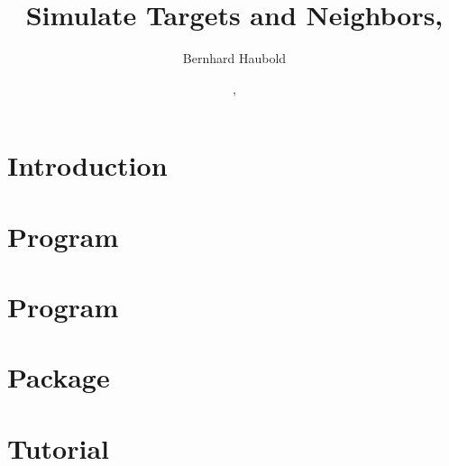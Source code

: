 \documentclass[a4paper]{report}
\begin{document}
\pagestyle{noweb}

\title{Simulate Targets and Neighbors, }
\author{Bernhard Haubold}
\date{\hspace{-3pt}, }
\maketitle
\tableofcontents
\chapter{Introduction}

\chapter{Program }

\chapter{Program }

\chapter{Package }

\chapter{Tutorial}



\end{document}

